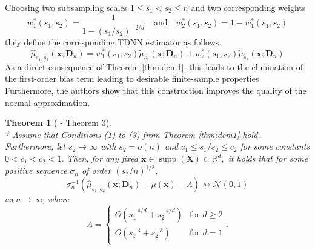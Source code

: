 \documentclass[letterpaper,10pt]{article}
\numberwithin{equation}{section}
\newtheorem{thm}{Theorem}
\numberwithin{thm}{section}
\numberwithin{lem}{section}
\numberwithin{cor}{section}
\renewcommand{\hat}{\widehat}
\newcommand{\1}{\mathbbm{1}}
\begin{document}
Choosing two subsampling scales $1 \leq s_1 < s_2 \leq n$ and two corresponding weights
\begin{equation}
	w_1^{*}(s_1, s_2) = \frac{1}{1-(s_1/s_2)^{-2/d}}
	\quad\text{and}\quad
	w_2^{*}(s_1, s_2) = 1 - w_1^{*}(s_1, s_2)
\end{equation}
they define the corresponding TDNN estimator as follows.
\begin{equation}
	\hat{\mu}_{s_1, s_2}\left(\mathbf{x}; \mathbf{D}_n\right)
	= w_1^{*}(s_1, s_2)\tilde{\mu}_{s_1}\left(\mathbf{x}; \mathbf{D}_n\right) + w_2^{*}(s_1, s_2)\tilde{\mu}_{s_2}\left(\mathbf{x}; \mathbf{D}_n\right)
\end{equation}
As a direct consequence of Theorem \ref{thm:dem1}, this leads to the elimination of the first-order bias term leading to desirable finite-sample properties.
Furthermore, the authors show that this construction improves the quality of the normal approximation.


\begin{thm}[\citet{demirkaya_optimal_2024} - Theorem 3]\label{thm:dem3}\mbox{}\\*
	Assume that Conditions (1) to (3) from Theorem \ref{thm:dem1} hold.
	Furthermore, let $s_2 \rightarrow \infty$ with $s_2 = o(n)$ and $c_1 \leq s_1/s_2 \leq c_2$ for some constants $0 < c_1 < c_2 < 1$.
	Then, for any fixed $\mathbf{x} \in \operatorname{supp}(\mathbf{X}) \subset \mathbb{R}^d,$ it holds that for some positive sequence $\sigma_n$ of order $(s_2/n)^{1/2}$,
	\begin{equation}
		\sigma_n^{-1} \left(\hat{\mu}_{s_1, s_2}\left(\mathbf{x}; \mathbf{D}_n\right) - \mu(\mathbf{x}) - \Lambda\right) \rightsquigarrow \mathcal{N}(0,1)
	\end{equation}
	as $n \rightarrow \infty$, where
	\begin{equation*}
		\Lambda = \begin{cases}
			O\left(s_1^{-4/d} + s_2^{-4/d}\right) & \text{for } d \geq 2 \\
			O\left(s_1^{-3} + s_2^{-3}\right)     & \text{for } d = 1    \\
		\end{cases}.
	\end{equation*}
\end{thm}
\end{document}
